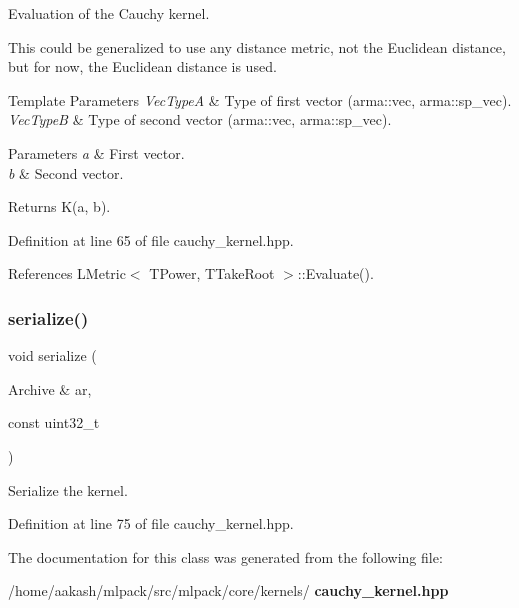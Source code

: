 Evaluation of the Cauchy kernel. 

This could be generalized to use any distance metric, not the Euclidean distance, but for now, the Euclidean distance is used.


\begin{DoxyTemplParams}{Template Parameters}
{\em Vec\+TypeA} & Type of first vector (arma\+::vec, arma\+::sp\+\_\+vec). \\
\hline
{\em Vec\+TypeB} & Type of second vector (arma\+::vec, arma\+::sp\+\_\+vec). \\
\hline
\end{DoxyTemplParams}

\begin{DoxyParams}{Parameters}
{\em a} & First vector. \\
\hline
{\em b} & Second vector. \\
\hline
\end{DoxyParams}
\begin{DoxyReturn}{Returns}
K(a, b). 
\end{DoxyReturn}


Definition at line 65 of file cauchy\+\_\+kernel.\+hpp.



References L\+Metric$<$ T\+Power, T\+Take\+Root $>$\+::\+Evaluate().

\mbox{\label{classmlpack_1_1kernel_1_1CauchyKernel_a65cba07328997659bec80b9879b15a51}} 
\subsubsection{serialize()}
{\footnotesize\ttfamily void serialize (\begin{DoxyParamCaption}\item[{Archive \&}]{ar,  }\item[{const uint32\+\_\+t}]{ }\end{DoxyParamCaption})\hspace{0.3cm}{\ttfamily [inline]}}



Serialize the kernel. 



Definition at line 75 of file cauchy\+\_\+kernel.\+hpp.



The documentation for this class was generated from the following file\+:\begin{DoxyCompactItemize}
\item 
/home/aakash/mlpack/src/mlpack/core/kernels/\textbf{ cauchy\+\_\+kernel.\+hpp}\end{DoxyCompactItemize}
